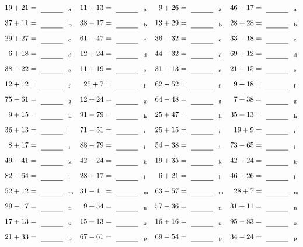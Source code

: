 \documentclass
[
  draft    = true,
  fontsize = 11pt,
  parskip  = half-
]
{scrartcl}
\begin{document}
\clearpage
\begin{align*}
    \pline{19+21}&=\rline{a}
  & \pline{11+13}&=\rline{a}
  & \pline{9+26}&=\rline{a}
  & \pline{46+17}&=\rline{a} \\[1ex]
    \pline{37+11}&=\rline{b}
  & \pline{38-17}&=\rline{b}
  & \pline{13+29}&=\rline{b}
  & \pline{28+28}&=\rline{b} \\[1ex]
    \pline{29+27}&=\rline{c}
  & \pline{61-47}&=\rline{c}
  & \pline{36-32}&=\rline{c}
  & \pline{33-18}&=\rline{c} \\[1ex]
    \pline{6+18}&=\rline{d}
  & \pline{12+24}&=\rline{d}
  & \pline{44-32}&=\rline{d}
  & \pline{69+12}&=\rline{d} \\[1ex]
    \pline{38-22}&=\rline{e}
  & \pline{11+19}&=\rline{e}
  & \pline{31-13}&=\rline{e}
  & \pline{21+15}&=\rline{e} \\[1ex]
    \pline{12+12}&=\rline{f}
  & \pline{25+7}&=\rline{f}
  & \pline{62-52}&=\rline{f}
  & \pline{9+18}&=\rline{f} \\[1ex]
    \pline{75-61}&=\rline{g}
  & \pline{12+24}&=\rline{g}
  & \pline{64-48}&=\rline{g}
  & \pline{7+38}&=\rline{g} \\[1ex]
    \pline{9+15}&=\rline{h}
  & \pline{91-79}&=\rline{h}
  & \pline{25+47}&=\rline{h}
  & \pline{35+13}&=\rline{h} \\[1ex]
    \pline{36+13}&=\rline{i}
  & \pline{71-51}&=\rline{i}
  & \pline{25+15}&=\rline{i}
  & \pline{19+9}&=\rline{i} \\[1ex]
    \pline{8+17}&=\rline{j}
  & \pline{88-79}&=\rline{j}
  & \pline{54-38}&=\rline{j}
  & \pline{73-65}&=\rline{j} \\[1ex]
    \pline{49-41}&=\rline{k}
  & \pline{42-24}&=\rline{k}
  & \pline{19+35}&=\rline{k}
  & \pline{42-24}&=\rline{k} \\[1ex]
    \pline{82-64}&=\rline{l}
  & \pline{28+17}&=\rline{l}
  & \pline{6+21}&=\rline{l}
  & \pline{46+26}&=\rline{l} \\[1ex]
    \pline{52+12}&=\rline{m}
  & \pline{31-11}&=\rline{m}
  & \pline{63-57}&=\rline{m}
  & \pline{28+7}&=\rline{m} \\[1ex]
    \pline{29-17}&=\rline{n}
  & \pline{9+54}&=\rline{n}
  & \pline{57-36}&=\rline{n}
  & \pline{31+11}&=\rline{n} \\[1ex]
    \pline{17+13}&=\rline{o}
  & \pline{15+13}&=\rline{o}
  & \pline{16+16}&=\rline{o}
  & \pline{95-83}&=\rline{o} \\[1ex]
    \pline{21+33}&=\rline{p}
  & \pline{67-61}&=\rline{p}
  & \pline{69-54}&=\rline{p}
  & \pline{34-24}&=\rline{p}
\end{align*}
\end{document}
